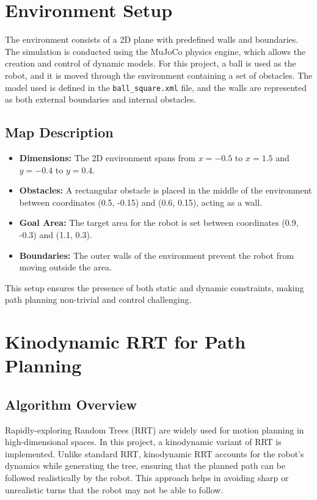 \documentclass[12pt]{article}
\begin{document}
\section{Environment Setup}
The environment consists of a 2D plane with predefined walls and boundaries. The simulation is conducted using the MuJoCo physics engine, which allows the creation and control of dynamic models. For this project, a ball is used as the robot, and it is moved through the environment containing a set of obstacles. The model used is defined in the \texttt{ball\_square.xml} file, and the walls are represented as both external boundaries and internal obstacles.

\subsection{Map Description}
\begin{itemize}
    \item \textbf{Dimensions:} The 2D environment spans from $x = -0.5$ to $x = 1.5$ and $y = -0.4$ to $y = 0.4$.
    \item \textbf{Obstacles:} A rectangular obstacle is placed in the middle of the environment between coordinates (0.5, -0.15) and (0.6, 0.15), acting as a wall.
    \item \textbf{Goal Area:} The target area for the robot is set between coordinates (0.9, -0.3) and (1.1, 0.3).
    \item \textbf{Boundaries:} The outer walls of the environment prevent the robot from moving outside the area.
\end{itemize}
This setup ensures the presence of both static and dynamic constraints, making path planning non-trivial and control challenging.

\section{Kinodynamic RRT for Path Planning}

\subsection{Algorithm Overview}
Rapidly-exploring Random Trees (RRT) are widely used for motion planning in high-dimensional spaces. In this project, a kinodynamic variant of RRT is implemented. Unlike standard RRT, kinodynamic RRT accounts for the robot’s dynamics while generating the tree, ensuring that the planned path can be followed realistically by the robot. This approach helps in avoiding sharp or unrealistic turns that the robot may not be able to follow.
\end{document}
